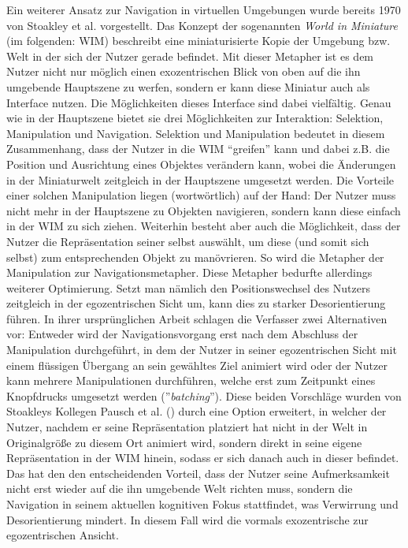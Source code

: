 Ein weiterer Ansatz zur Navigation in virtuellen Umgebungen wurde bereits 1970 von Stoakley et al. \cite{Stoakley2010VirtualWIM} vorgestellt. Das Konzept der sogenannten \textit{World in Miniature} (im folgenden: WIM) beschreibt eine miniaturisierte Kopie der Umgebung bzw. Welt in der sich der Nutzer gerade befindet. Mit dieser Metapher ist es dem Nutzer nicht nur möglich einen exozentrischen Blick von oben auf die ihn umgebende Hauptszene zu werfen, sondern er kann diese Miniatur auch als Interface nutzen. Die Möglichkeiten dieses Interface sind dabei vielfältig. Genau wie in der Hauptszene bietet sie drei Möglichkeiten zur Interaktion: Selektion, Manipulation und Navigation.
Selektion und Manipulation bedeutet in diesem Zusammenhang, dass der Nutzer in die WIM “greifen” kann und dabei z.B. die Position und Ausrichtung eines Objektes verändern kann, wobei die Änderungen in der Miniaturwelt zeitgleich in der Hauptszene umgesetzt werden. Die Vorteile einer solchen Manipulation liegen (wortwörtlich) auf der Hand: Der Nutzer muss nicht mehr in der Hauptszene zu Objekten navigieren, sondern kann diese einfach in der WIM zu sich ziehen. 
Weiterhin besteht aber auch die Möglichkeit, dass der Nutzer die Repräsentation seiner selbst auswählt, um diese (und somit sich selbst) zum entsprechenden Objekt zu manövrieren. So wird die Metapher der Manipulation zur Navigationsmetapher.
Diese Metapher bedurfte allerdings weiterer Optimierung. Setzt man nämlich den Positionswechsel des Nutzers zeitgleich in der egozentrischen Sicht um, kann dies zu starker Desorientierung führen. In ihrer ursprünglichen Arbeit schlagen die Verfasser zwei Alternativen vor: Entweder wird der Navigationsvorgang erst nach dem Abschluss der Manipulation durchgeführt, in dem der Nutzer in seiner egozentrischen Sicht mit einem flüssigen Übergang an sein gewähltes Ziel animiert wird oder der Nutzer kann mehrere Manipulationen durchführen, welche erst zum Zeitpunkt eines Knopfdrucks umgesetzt werden (”\textit{batching}”). 
Diese beiden Vorschläge wurden von Stoakleys Kollegen Pausch et al. (\cite{5_pausch_WIMb}) durch eine Option erweitert, in welcher der Nutzer, nachdem er seine Repräsentation platziert hat nicht in der Welt in Originalgröße zu diesem Ort animiert wird, sondern direkt in seine eigene Repräsentation in der WIM hinein, sodass er sich danach auch in dieser befindet.
Das hat den den entscheidenden Vorteil, dass der Nutzer seine Aufmerksamkeit nicht erst wieder auf die ihn umgebende Welt richten muss, sondern die Navigation in seinem aktuellen kognitiven Fokus stattfindet, was Verwirrung und Desorientierung mindert. In diesem Fall wird die vormals exozentrische zur egozentrischen Ansicht.
